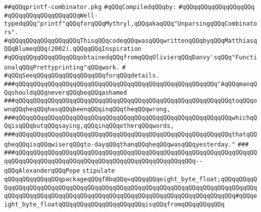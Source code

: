 \label{src/lib/src/printf-combinator.pkg}
\verb|##qQQqprintf-combinator.pkg|\newline
\newline
\verb|#qQQqCompiledqQQqby:|\newline
\verb|#qQQqqQQqqQQqqQQqqQQq|\newline
\newline
\verb|#qQQqqQQqqQQqqQQqqQQqWell-typedqQQq"printf"qQQqforqQQqMythryl,qQQqakaqQQq"UnparsingqQQqCombinators".|\newline
\verb|#qQQqqQQqqQQqqQQqqQQqThisqQQqcodeqQQqwasqQQqwrittenqQQqbyqQQqMatthiasqQQqBlumeqQQq(2002).qQQqqQQqInspiration|\newline
\verb|#qQQqqQQqqQQqqQQqqQQqobtainedqQQqfromqQQqOlivierqQQqDanvy'sqQQq"FunctionalqQQqPrettyprinting"qQQqwork.|\newline
\verb|#|\newline
\verb|#qQQqSeeqQQqqQQq|\verb|qQQqqQQqqQQqforqQQqdetails.|\newline
\newline
\newline
\verb|###qQQqqQQqqQQqqQQqqQQqqQQqqQQqqQQqqQQqqQQqqQQqqQQqqQQqqQQq"AqQQqmanqQQqshouldqQQqneverqQQqbeqQQqashamed|\newline
\verb|###qQQqqQQqqQQqqQQqqQQqqQQqqQQqqQQqqQQqqQQqqQQqqQQqqQQqqQQqqQQqtoqQQqownqQQqheqQQqhasqQQqbeenqQQqinqQQqtheqQQqwrong,|\newline
\verb|###qQQqqQQqqQQqqQQqqQQqqQQqqQQqqQQqqQQqqQQqqQQqqQQqqQQqqQQqqQQqwhichqQQqisqQQqbutqQQqsaying,qQQqinqQQqotherqQQqwords,|\newline
\verb|###qQQqqQQqqQQqqQQqqQQqqQQqqQQqqQQqqQQqqQQqqQQqqQQqqQQqqQQqqQQqthatqQQqheqQQqisqQQqwiserqQQqto-dayqQQqthanqQQqheqQQqwasqQQqyesterday."|\newline
\verb|###|\newline
\verb|###qQQqqQQqqQQqqQQqqQQqqQQqqQQqqQQqqQQqqQQqqQQqqQQqqQQqqQQqqQQqqQQqqQQqqQQqqQQqqQQqqQQqqQQqqQQqqQQqqQQqqQQqqQQqqQQqqQQqqQQq--qQQqAlexanderqQQqPope|\newline
\newline
\newline
\newline
\verb|stipulate|\newline
\verb|qQQqqQQqqQQqqQQqpackageqQQqf8bqQQq=qQQqqQQqeight_byte_float;qQQqqQQqqQQqqQQqqQQqqQQqqQQqqQQqqQQqqQQqqQQqqQQqqQQqqQQqqQQqqQQqqQQqqQQqqQQqqQQqqQQqqQQqqQQqqQQqqQQqqQQqqQQqqQQqqQQqqQQqqQQqqQQqqQQqqQQqqQQqqQQq#qQQqeight_byte_floatqQQqqQQqqQQqqQQqqQQqqQQqisqQQqfromqQQqqQQqqQQq|\newline
